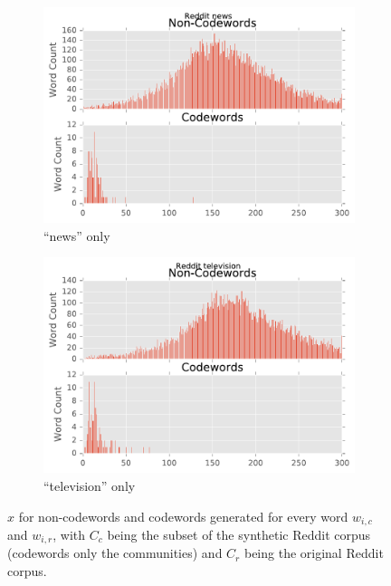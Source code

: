 \begin{figure}[H]
\begin{subfigure}[t]{.4\textwidth}
\centering\includegraphics[]{figures/reddit-news-only-count.pdf}
\caption{``news'' only}
\label{fig-reddit-news-only-count}
\end{subfigure}
\begin{subfigure}[t]{.4\textwidth}
\centering\includegraphics[]{figures/reddit-television-only-count.pdf}
\caption{``television'' only}
\label{fig-reddit-television-only-count}
\end{subfigure}
\caption{$x$ for non-codewords and codewords generated for every word $w_{i, c}$ and $w_{i, r}$, with $C_c$ being the subset of the synthetic Reddit corpus (codewords only the communities) and $C_r$ being the original Reddit corpus.}
\label{fig-reddit-community-only-count}
\end{figure}

